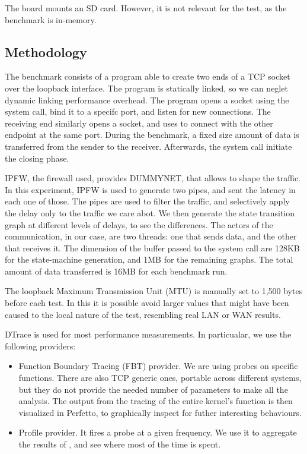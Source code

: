 \documentclass[a4paper,10pt]{article}
\begin{document}
The board mounts an SD card. However, it is not relevant for the test, as the benchmark is in-memory.
      

\subsection {Methodology}

The benchmark consists of a program able to create two ends of a TCP socket over the loopback interface. The program is statically linked, so we can neglet dynamic linking performance overhead. The program opens a socket using the  system call, bind it to a specifc port, and listen for new connections. The receiving end similarly opens a socket, and uses  to connect with the other endpoint at the same port. During the benchmark, a fixed size amount of data is transferred from the sender to the receiver. Afterwards, the  system call initiate the closing phase.

IPFW, the firewall used, provides DUMMYNET\cite{luigirizzo_luigirizzodummynet_2020}, that allows to shape the traffic. In this experiment, IPFW is used to generate two pipes, and sent the latency in each one of those. The pipes are used to filter the traffic, and selectively apply the delay only to the traffic we care abot. We then generate the state transition graph at different levels of delays, to see the differences.
The actors of the communication, in our case, are two threads: one that sends data, and the other that receives it. The dimension of the buffer passed to the  system call are 128KB for the state-machine generation, and 1MB for the remaining graphs.
The total amount of data transferred is 16MB for each benchmark run.

The loopback Maximum Transmission Unit (MTU) is manually set to 1,500 bytes before each test. In this it is possible avoid larger values that might have been caused to the local nature of the test, resembling real LAN or WAN results.

DTrace is used for most performance measurements. In particualar, we use the following providers:

\begin{itemize}
   \item Function Boundary Tracing (FBT) provider. We are using probes on specific functions. There are also TCP generic ones, portable across different systems, but they do not provide the needed number of parameters to make all the analysis. The output from the tracing of the entire kernel's function is then visualized in Perfetto\cite{noauthor_perfetto_nodate}, to graphically inspect for futher interesting behaviours.
   \item Profile provider. It fires a probe at a given frequency. We use it to aggregate the results of , and see where most of the time is spent. 
\end{itemize}
\end{document}
